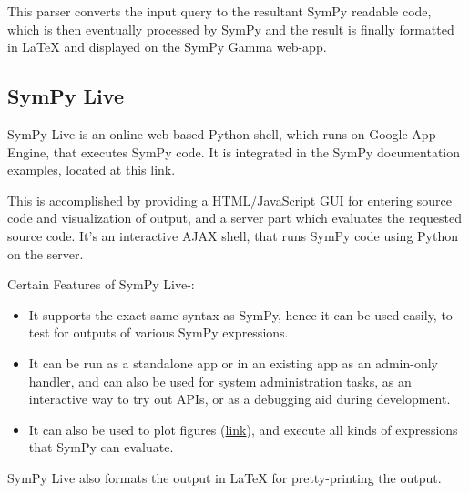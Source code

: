 This parser converts the input query to the resultant SymPy readable 
code, which is then eventually processed by SymPy and the result is 
finally formatted in LaTeX and displayed on the SymPy Gamma web-app.

\subsection{SymPy Live}\label{sympy-live}

SymPy Live is an online web-based Python shell, which runs on Google
App Engine, that executes SymPy code. It is integrated in the SymPy
documentation examples, located at this \href{http://docs.sympy.org/latest/index.html}{link}.

This is accomplished by providing a HTML/JavaScript GUI for entering
source code and visualization of output, and a server part which
evaluates the requested source code. It's an interactive AJAX shell,
that runs SymPy code using Python on the server.

Certain Features of SymPy Live-:

\begin{itemize}
\item
  It supports the exact same syntax as SymPy, hence it can be used
  easily, to test for outputs of various SymPy expressions.
\item
  It can be run as a standalone app or in an existing app as an
  admin-only handler, and can also be used for system administration
  tasks, as an interactive way to try out APIs, or as a debugging aid
  during development.
\item
  It can also be used to plot figures (\href{http://live.sympy.org/?evaluate=from\%20sympy\%20import\%20symbols\%0Afrom\%20sympy.plotting\%20import\%20textplot\%0Ax\%20\%3D\%20symbols(\%27x\%27)\%0Atextplot(x**2\%2C0\%2C5)\%0A\%23--\%0A}{link}), 
  and execute all kinds of expressions that SymPy can evaluate.
\end{itemize}

SymPy Live also formats the output in LaTeX for pretty-printing the
output.